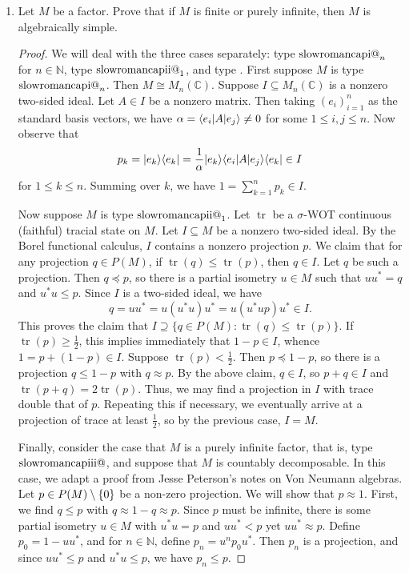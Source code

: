 \documentclass[a4paper,10pt]{report}
\makeatletter
\DeclarePairedDelimiter{\set}{\{}{\}}
\DeclarePairedDelimiter{\ket}{|}{\rangle}
\DeclarePairedDelimiter{\bra}{\langle}{|}
\newcommand{\N}{\mathbb{N}}
\newcommand{\C}{\mathbb{C}}
\DeclareMathOperator{\tr}{tr}
\newcommand{\Romnum}[1]{\expandafter\@slowromancap\romannumeral #1@}
\newcommand{\factor}[1]{\text{\Romnum{#1}}}
\makeatother
\begin{document}
\begin{enumerate}
\item
 Let $M$ be a factor.
 Prove that if $M$ is finite or purely infinite, then $M$ is algebraically simple.
 \begin{proof}
 	We will deal with the three cases separately:
	type $\factor{1}_n$ for $n \in \N$, type $\factor{2}_1$, and type \factor{3}.
	First suppose $M$ is type $\factor{1}_n$.
	Then $M \cong M_n(\C)$.
	Suppose $I \subseteq M_n(\C)$ is a nonzero two-sided ideal.
	Let $A \in I$ be a nonzero matrix.
	Then taking $\left(e_i\right)_{i=1}^n$ as the standard basis vectors,
	we have $\alpha = \bra{e_i}A\ket{e_j} \ne 0$ for some $1 \le i, j \le n$.
	Now observe that
	$$p_k = \ket{e_k} \bra{e_k} = \frac{1}{\alpha}\ket{e_k}\bra{e_i} A \ket{e_j} \bra{e_k} \in I$$
	for $1 \le k \le n$.
	Summing over $k$, we have $1 = \sum_{k=1}^n{p_k} \in I$.
	
	Now suppose $M$ is type $\factor{2}_1$.
	Let $\tr$ be a $\sigma$-WOT continuous (faithful) tracial state on $M$.
	Let $I \subseteq M$ be a nonzero two-sided ideal.
	By the Borel functional calculus, $I$ contains a nonzero projection $p$.
	We claim that for any projection $q \in P(M)$, if $\tr(q) \le \tr(p)$, then $q \in I$.
	Let $q$ be such a projection.
	Then $q \preceq p$, so there is a partial isometry $u \in M$
	such that $uu^* = q$ and $u^*u \le p$.
	Since $I$ is a two-sided ideal, we have
	$$q = uu^* = u(u^*u)u^* = u(u^*up)u^* \in I.$$
	This proves the claim that $I \supseteq \{q \in P(M) : \tr(q) \le \tr(p)\}$.
	If $\tr(p) \ge \frac{1}{2}$, this implies immediately that $1 - p \in I$, whence $1 = p + (1 - p) \in I$.
	Suppose $\tr(p) < \frac{1}{2}$.
	Then $p \preceq 1 - p$, so there is a projection $q \le 1 - p$ with $q \approx p$.
	By the above claim, $q \in I$, so $p + q \in I$ and $\tr(p + q) = 2\tr(p)$.
	Thus, we may find a projection in $I$ with trace double that of $p$.
	Repeating this if necessary, we eventually arrive at a projection of trace at least $\frac{1}{2}$,
	so by the previous case, $I = M$.

		Finally, consider the case that $M$ is a purely infinite factor, that is, type $\factor{3}$, and suppose that $M$ is countably decomposable. In this case, we adapt a proof from Jesse Peterson's notes on Von Neumann algebras. Let $p\in P(M)\setminus\set{0}$ be a non-zero projection. We will show that $p\approx 1$. First, we find $q\le p$ with $q\approx 1-q\approx p$. Since $p$ must be infinite, there is some partial isometry $u\in M$ with $u^*u=p$ and $uu^*<p$ yet $uu^*\approx p$. Define $p_0=1-uu^*$, and for $n\in\N$, define $p_n=u^np_0u^*$. Then $p_n$ is a projection, and since $uu^*\le p$ and $u^*u\le p$, we have $p_n\le p$. 
		

\end{proof}
\end{enumerate}
\end{document}
